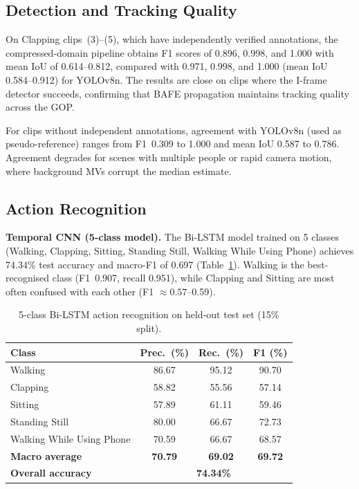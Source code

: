 \documentclass[conference]{IEEEtran}
\begin{document}
\subsection{Detection and Tracking Quality}

On Clapping clips~(3)--(5), which have independently verified annotations, the compressed-domain pipeline obtains F1 scores of 0.896, 0.998, and 1.000 with mean IoU of 0.614--0.812, compared with 0.971, 0.998, and 1.000 (mean IoU 0.584--0.912) for YOLOv8n. The results are close on clips where the I-frame detector succeeds, confirming that BAFE propagation maintains tracking quality across the GOP.

For clips without independent annotations, agreement with YOLOv8n (used as pseudo-reference) ranges from F1~0.309 to 1.000 and mean IoU 0.587 to 0.786. Agreement degrades for scenes with multiple people or rapid camera motion, where background MVs corrupt the median estimate.

\subsection{Action Recognition}

\textbf{Temporal CNN (5-class model).}
The Bi-LSTM model trained on 5 classes (Walking, Clapping, Sitting, Standing Still, Walking While Using Phone) achieves 74.34\% test accuracy and macro-F1 of 0.697 (Table~\ref{tab:ar5}). Walking is the best-recognised class (F1~0.907, recall 0.951), while Clapping and Sitting are most often confused with each other (F1 $\approx 0.57$--0.59).

\begin{table}[t]
\caption{5-class Bi-LSTM action recognition on held-out test set (15\% split).}
\label{tab:ar5}
\centering
\small
\begin{tabular}{lccc}
\toprule
Class & Prec.\ (\%) & Rec.\ (\%) & F1 (\%) \\
\midrule
Walking                   & 86.67 & 95.12 & 90.70 \\
Clapping                  & 58.82 & 55.56 & 57.14 \\
Sitting                   & 57.89 & 61.11 & 59.46 \\
Standing Still            & 80.00 & 66.67 & 72.73 \\
Walking While Using Phone & 70.59 & 66.67 & 68.57 \\
\midrule
\textbf{Macro average}    & \textbf{70.79} & \textbf{69.02} & \textbf{69.72} \\
\textbf{Overall accuracy} & \multicolumn{3}{c}{\textbf{74.34\%}} \\
\bottomrule
\end{tabular}
\end{table}
\end{document}

